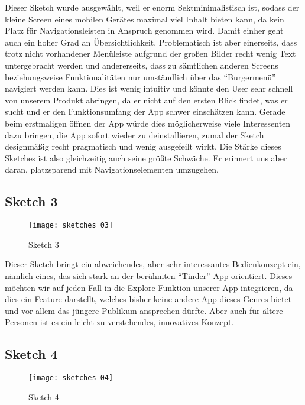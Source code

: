 Dieser Sketch wurde ausgewählt, weil er enorm Sektminimalistisch ist, sodass der kleine Screen eines mobilen Gerätes maximal viel Inhalt bieten kann, da kein Platz für Navigationsleisten in Anspruch genommen wird. Damit einher geht auch ein hoher Grad an Übersichtlichkeit. Problematisch ist aber einerseits, dass trotz nicht vorhandener Menüleiste aufgrund der großen Bilder recht wenig Text untergebracht werden und andererseits, dass zu sämtlichen anderen Screens beziehungsweise Funktionalitäten nur umständlich über das \enquote{Burgermenü} navigiert werden kann. Dies ist wenig intuitiv und könnte den User sehr schnell von unserem Produkt abringen, da er nicht auf den ersten Blick findet, was er sucht und er den Funktionsumfang der App schwer einschätzen kann. Gerade beim erstmaligen öffnen der App würde dies möglicherweise viele Interessenten dazu bringen, die App sofort wieder zu deinstallieren, zumal der Sketch designmäßig recht pragmatisch und wenig ausgefeilt wirkt. Die Stärke dieses Sketches ist also gleichzeitig auch seine größte Schwäche. Er erinnert uns aber daran, platzsparend mit Navigationselementen umzugehen.

\subsection{Sketch 3}

\begin{figure}[h]
  \centering
  \texttt{[image: sketches 03]}
  \caption{Sketch 3}
  \label{fig:sketch-03}
\end{figure}

Dieser Sketch bringt ein abweichendes, aber sehr interessantes Bedienkonzept ein, nämlich eines, das sich stark an der berühmten \enquote{Tinder}-App orientiert. Dieses möchten wir auf jeden Fall in die Explore-Funktion unserer App integrieren, da dies ein Feature darstellt, welches bisher keine andere App dieses Genres bietet und vor allem das jüngere Publikum ansprechen dürfte. Aber auch für ältere Personen ist es ein leicht zu verstehendes, innovatives Konzept.

\subsection{Sketch 4}

\begin{figure}[H]
  \centering
  \texttt{[image: sketches 04]}
  \caption{Sketch 4}
  \label{fig:sketch-04}
\end{figure}

